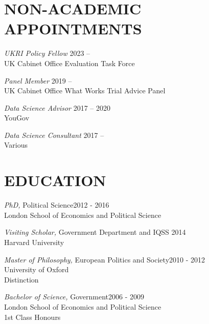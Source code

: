 \documentclass[centered]{res}
\begin{document}
\begin{resume}
\section{NON-ACADEMIC APPOINTMENTS}

\vspace{.5cm}

{\sl UKRI Policy Fellow} \hfill 2023 --\\
UK Cabinet Office Evaluation Task Force

{\sl Panel Member} \hfill 2019 --\\
UK Cabinet Office What Works Trial Advice Panel

{\sl Data Science Advisor} \hfill 2017 -- 2020\\
YouGov

{\sl Data Science Consultant} \hfill 2017 -- \\
Various


\section{EDUCATION} 

\vspace{.5cm}

		{\sl PhD,} Political Science\hfill 2012 - 2016\\
                London School of Economics and Political Science

		{\sl Visiting Scholar,} Government Department and IQSS \hfill  2014\\
                 Harvard University  

		{\sl Master of Philosophy,} European Politics and Society\hfill 2010 - 2012 \\
                University of Oxford \\
               Distinction 

		{\sl Bachelor of Science,} Government\hfill 2006 - 2009 \\
                London School of Economics and Political Science \\
                1st Class Honours 



\end{resume}
\end{document}
